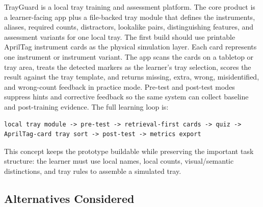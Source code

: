 \documentclass[10pt,a4paper]{article}
\begin{document}
TrayGuard is a local tray training and assessment platform. The core product is
a learner-facing app plus a file-backed tray module that defines the
instruments, aliases, required counts, distractors, lookalike pairs,
distinguishing features, and assessment variants for one local tray.
The first build should use printable AprilTag instrument cards as the physical
simulation layer. Each card represents one instrument or instrument variant.
The app scans the cards on a tabletop or tray area, treats the detected markers
as the learner's tray selection, scores the result against the tray template,
and returns missing, extra, wrong, misidentified, and wrong-count feedback in
practice mode. Pre-test and post-test modes suppress hints and corrective
feedback so the same system can collect baseline and post-training evidence.
The full learning loop is:
\begin{lstlisting}
local tray module -> pre-test -> retrieval-first cards -> quiz -> AprilTag-card tray sort -> post-test -> metrics export
\end{lstlisting}
This concept keeps the prototype buildable while preserving the important task
structure: the learner must use local names, local counts, visual/semantic
distinctions, and tray rules to assemble a simulated tray.

\subsection{Alternatives Considered}
\end{document}
